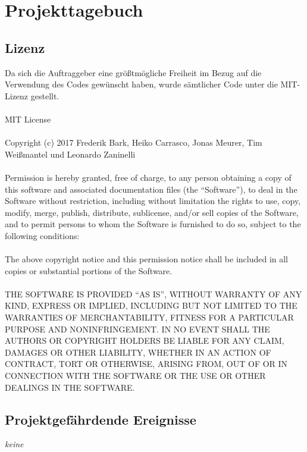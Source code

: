 \section{Projekttagebuch}
\subsection{Lizenz}
	Da sich die Auftraggeber eine größtmögliche Freiheit im Bezug
	auf die Verwendung des Codes gewünscht haben,
	wurde sämtlicher Code unter die MIT-Lizenz gestellt.
	\vspace{4em}
	\\\\
	MIT License
	\\\\
	Copyright (c) 2017 Frederik Bark, Heiko Carrasco, Jonas Meurer, Tim Weißmantel und Leonardo Zaninelli
	\\\\
	Permission is hereby granted, free of charge, to any person obtaining a copy of this software and associated documentation files (the ``Software''), to deal in the Software without restriction, including without limitation the rights to use, copy, modify, merge, publish, distribute, sublicense, and/or sell copies of the Software, and to permit persons to whom the Software is furnished to do so, subject to the following conditions:
	\\\\
	The above copyright notice and this permission notice shall be included in all copies or substantial portions of the Software.
	\\\\
	THE SOFTWARE IS PROVIDED ``AS IS'', WITHOUT WARRANTY OF ANY KIND, EXPRESS OR IMPLIED, INCLUDING BUT NOT LIMITED TO THE WARRANTIES OF MERCHANTABILITY, FITNESS FOR A PARTICULAR PURPOSE AND NONINFRINGEMENT. IN NO EVENT SHALL THE AUTHORS OR COPYRIGHT HOLDERS BE LIABLE FOR ANY CLAIM, DAMAGES OR OTHER LIABILITY, WHETHER IN AN ACTION OF CONTRACT, TORT OR OTHERWISE, ARISING FROM, OUT OF OR IN CONNECTION WITH THE SOFTWARE OR THE USE OR OTHER DEALINGS IN THE SOFTWARE.

	
\subsection{Projektgefährdende Ereignisse}
\textit{keine}
